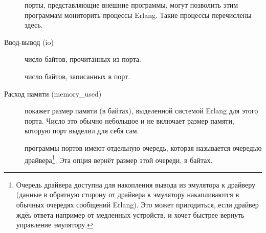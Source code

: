 \begin{description*}
\begin{description}
	\item[] порты, представляющие внешние программы, могут позволить этим программам мониторить процессы Erlang. Такие процессы перечислены здесь.
\end{description}
	
\item[Ввод-вывод (io)] \hfill
\begin{description}		
	\item[] число байтов, прочитанных из порта.
	
	\item[] число байтов, записанных в порт.
\end{description}

\item[Расход памяти (memory\_used)] \hfill
\begin{description}		
	\item[] покажет размер памяти (в байтах), выделенной системой Erlang для этого порта. Число это обычно небольшое и не включает размер памяти, которую порт выделил для себя сам.
	
	\item[] программы портов имеют отдельную очередь, которая называется очередью драйвера\footnote{Очередь драйвера доступна для накопления вывода из эмулятора к драйверу (данные в обратную сторону от драйвера к эмулятору накапливаются в обычных очередях сообщений Erlang). Это может пригодиться, если драйвер ждёь ответа например от медленных устройств, и хочет быстрее вернуть управление эмулятору.}. Эта опция вернёт размер этой очереди, в байтах.
\end{description}
	

\end{description*}
